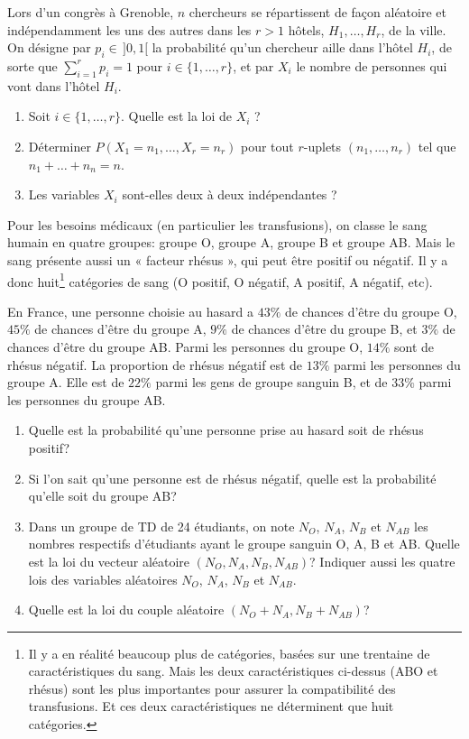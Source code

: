\documentclass[a4paper,12pt,reqno]{amsart}
\begin{document}
\begin{exo}

  Lors d'un congrès à Grenoble, $n$ chercheurs se répartissent de façon aléatoire et indépendamment les uns des autres dans les $r > 1$ hôtels, $H_1,\ldots,H_r$, de la ville. On désigne par $p_i \in\, ]0,1[$ la probabilité qu'un chercheur aille dans l'hôtel $H_i$, de sorte que $\sum_{i=1}^rp_i=1$ pour $i\in\{1,\ldots,r\}$, et par $X_i$ le nombre de personnes qui vont dans l'hôtel $H_i$.
  \begin{enumerate}
    \item Soit $i\in\{1,\ldots,r\}$. Quelle est la loi de $X_i$ ?
    \item Déterminer  $P(X_1=n_1,\ldots,X_r=n_r)$ pour tout $r$-uplets $(n_1,\ldots,n_r)$ tel que $n_1+\ldots +n_n=n$.
    \item Les variables $X_i$ sont-elles deux à deux indépendantes ?
  \end{enumerate}

\end{exo}

\begin{exo}

  Pour les besoins médicaux (en particulier les transfusions), on classe le sang humain en quatre groupes: groupe O, groupe A, groupe B et groupe AB. Mais le sang présente aussi un « facteur rhésus », qui peut être positif ou négatif. Il y a donc huit\footnote{Il y a en réalité beaucoup plus de catégories, basées sur une trentaine de caractéristiques du sang. Mais les deux caractéristiques ci-dessus (ABO et rhésus) sont les plus importantes pour assurer la compatibilité des transfusions. Et ces deux caractéristiques ne déterminent que huit catégories.} catégories de sang (O positif, O négatif, A positif, A négatif, etc).

  En France, une personne choisie au hasard a $43\%$ de chances d'être du groupe O, $45\%$ de chances d'être du groupe A, $9\%$ de chances d'être du groupe B, et $3\%$ de chances d'être du groupe AB. Parmi les personnes du groupe O, $14\%$ sont de rhésus négatif. La proportion de rhésus négatif est de $13\%$ parmi les personnes du groupe A. Elle est de $22\%$ parmi les gens de groupe sanguin B, et de $33\%$ parmi les personnes du groupe AB.
  \begin{enumerate}
    \item Quelle est la probabilité qu'une personne prise au hasard soit de rhésus positif?
    \item Si l'on sait qu'une personne est de rhésus négatif, quelle est la probabilité qu'elle soit du groupe AB?
    \item Dans un groupe de TD de 24 étudiants, on note $N_O$, $N_A$, $N_B$ et $N_{AB}$ les nombres respectifs d'étudiants ayant le groupe sanguin O, A, B et AB. Quelle est la loi du vecteur aléatoire  $(N_O,N_A,N_B,N_{AB})$? Indiquer aussi les quatre lois des variables aléatoires $N_O$, $N_A$, $N_B$ et $N_{AB}$.
    \item Quelle est la loi du couple aléatoire $(N_O+N_A,N_B+N_{AB})$?
  \end{enumerate}
\end{exo}
\end{document}
